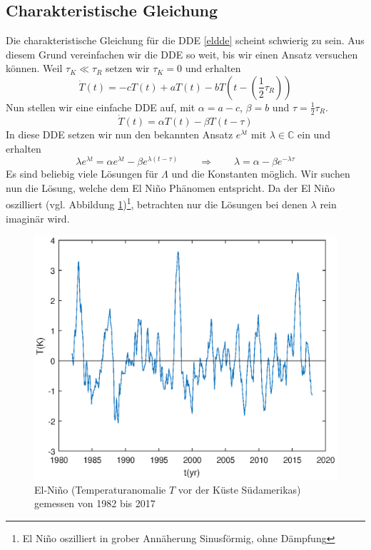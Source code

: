 \subsection{Charakteristische Gleichung}
Die charakteristische Gleichung für die DDE \eqref{eldde} scheint schwierig zu sein. 
Aus diesem Grund vereinfachen wir die DDE so weit, bis wir einen Ansatz versuchen können.
Weil $\tau_K \ll \tau_R$ setzen wir $\tau_K = 0$ und erhalten
\begin{equation}
	\dot{T}(t)=-cT(t)+aT(t)-bT(t-(\frac{1}{2}\tau_R))
\end{equation}
Nun stellen wir eine einfache DDE auf, mit $\alpha = a-c$, $\beta = b$ und $\tau = \frac{1}{2}\tau_R$.
\begin{equation}
	\dot{T}(t)=\alpha T(t)-\beta T(t-\tau)
\end{equation}
In diese DDE setzen wir nun den bekannten Ansatz $e^{\lambda t}$ mit $\lambda \in \mathbb{C}$ ein und erhalten
\begin{equation} \label{char_eldde}
	\lambda e^{\lambda t} = \alpha e^{\lambda t} - \beta e^{\lambda(t-\tau)} \qquad\Rightarrow\qquad \lambda = \alpha-\beta e^{-\lambda \tau}
\end{equation}
Es sind beliebig viele Lösungen für $\Lambda$ und die Konstanten möglich.
Wir suchen nun die Lösung, welche dem El Niño Phänomen entspricht.
Da der El Niño oszilliert (vgl. Abbildung \ref{fig:elnino})\footnote{El Niño oszilliert in grober Annäherung Sinusförmig, ohne Dämpfung}, betrachten nur die Lösungen bei denen $\lambda$ rein imaginär wird.
\begin{figure}
	\centering
	\includegraphics{verzoegert/inp/figures/elnino.eps}
	\caption{El-Niño (Temperaturanomalie $T$ vor der Küste Südamerikas) gemessen von 1982 bis 2017}
	\label{fig:elnino}
\end{figure}
